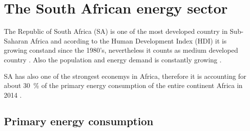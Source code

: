 \chapter{The South African energy sector}
The Republic of South Africa (SA) is one of the most developed country in Sub-Saharan Africa and acording to the Human Development Index (HDI) it is growing constand since the 1980's, nevertheless it counts as medium developed country \cite{UNDP2014}. Also the population and energy demand is constantly growing \cite{TheWorldBank2015,Agency2015}.

SA has also one of the strongest econemys in Africa, therefore it is accounting for about 30~\% of the primary energy consumption of the entire continent Africa in 2014 \cite{BP2015b}. 
\section{Primary energy consumption}
